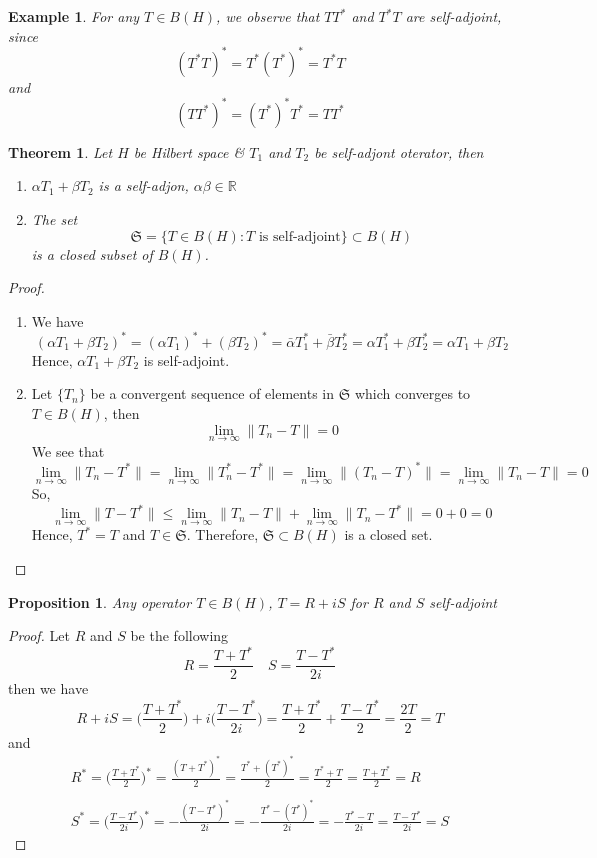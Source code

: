 \documentclass{report}
\newtheorem{thm}{Theorem}
\newtheorem{exm}{Example}
\newtheorem{prop}{Proposition}
\begin{document}
\begin{exm}
For any $T \in B(H)$, we observe that $T T^{*}$ and $T^{*} T$ are self-adjoint, since
$$
(T^{*}T)^{*} = T^{*}(T^{*})^{*} = T^{*}T
$$
and
$$
(TT^{*})^{*} = (T^{*})^{*}T^{*} = TT^{*}
$$
\end{exm}

\begin{thm}
Let $H$ be Hilbert space \& $T_{1}$ and $T_{2}$ be self-adjont oterator, then
  \begin{enumerate}
    \item $\alpha T_{1}+\beta T_{2}$ is a self-adjon, $\alpha \beta \in \mathbb{R}$
    \item The set
      $$
      \mathfrak{S} = \{T\in B(H): T\text{ is self-adjoint}\}\subset B(H)
      $$
      is a closed subset of $B(H)$.
  \end{enumerate}
\end{thm}
\begin{proof}
  \begin{enumerate}
    \item We have
      $$
      (\alpha T_{1}+\beta T_{2})^{*} = (\alpha T_{1})^{*} + (\beta T_{2})^{*} = \bar{\alpha} T_{1}^{*}+\bar{\beta} T_{2}^{*} = \alpha T_{1}^{*}+\beta T_{2}^{*} = \alpha T_{1}+ \beta T_{2}
      $$
      Hence, $\alpha T_{1}+\beta T_{2}$ is self-adjoint.
    \item Let $\{T_{n}\}$ be a convergent sequence of elements in $\mathfrak{S}$ which converges to $T\in B(H)$, then
      $$
      \lim_{n\to\infty}\lVert T_{n}-T\rVert = 0
      $$
      We see that
      $$
      \lim_{n\to\infty}\lVert T_{n}-T^{*}\rVert = \lim_{n\to\infty}\lVert T_{n}^{*}-T^{*}\rVert = \lim_{n\to\infty}\lVert (T_{n}-T)^{*}\rVert = \lim_{n\to\infty}\lVert T_{n}-T\rVert = 0
      $$
      So,
      $$
      \lim_{n\to\infty}\lVert T-T^{*}\rVert\leq\lim_{n\to\infty}\lVert T_{n}-T\rVert+\lim_{n\to\infty}\lVert T_{n}-T^{*}\rVert = 0+0 = 0
      $$
      Hence, $T^{*}=T$ and $T\in\mathfrak{S}$. Therefore, $\mathfrak{S}\subset B(H)$ is a closed set.
  \end{enumerate}

\end{proof}

\begin{prop}
Any operator $T \in B(H)$, $T=R+i S$ for $R$ and $S$ self-adjoint
\end{prop}
\begin{proof}
  Let $R$ and $S$ be the following
  $$
  R=\frac{T+T^{*}}{2}\quad S=\frac{T-T^{*}}{2i}
  $$
  then we have
  $$
  R+iS = \Big(\frac{T+T^{*}}{2}\Big)+i\Big(\frac{T-T^{*}}{2i}\Big) = \frac{T+T^{*}}{2}+\frac{T-T^{*}}{2} = \frac{2T}{2} = T
  $$
  and
  $$
  \begin{aligned}
    R^{*} = \Big(\frac{T+T^{*}}{2}\Big)^{*} = \frac{(T+T^{*})^{*}}{2} = \frac{T^{*}+(T^{*})^{*}}{2} = \frac{T^{*}+T}{2} = \frac{T+T^{*}}{2} = R \\ \\
    S^{*} = \Big(\frac{T-T^{*}}{2i}\Big)^{*} = -\frac{(T-T^{*})^{*}}{2i} = -\frac{T^{*}-(T^{*})^{*}}{2i} = -\frac{T^{*}-T}{2i} = \frac{T-T^{*}}{2i} = S
  \end{aligned}
  $$
\end{proof}
\end{document}
